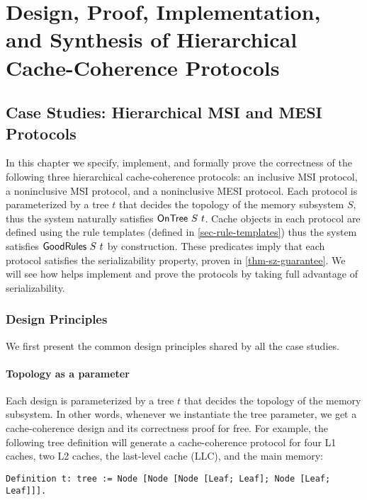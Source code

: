 \part{Design, Proof, Implementation, and Synthesis of Hierarchical Cache-Coherence Protocols}

\chapter{Case Studies: Hierarchical MSI and MESI Protocols}
\label{sec-case-study}

In this chapter we specify, implement, and formally prove the correctness of the following three hierarchical cache-coherence protocols: an inclusive MSI protocol, a noninclusive MSI protocol, and a noninclusive MESI protocol.
Each protocol is parameterized by a tree $t$ that decides the topology of the memory subsystem $S$, thus the system naturally satisfies $\mathsf{OnTree}\ S\ t$.
Cache objects in each protocol are defined using the rule templates (defined in \autoref{sec-rule-templates}) thus the system satisfies $\mathsf{GoodRules}\ S\ t$ by construction.
These predicates imply that each protocol satisfies the serializability property, proven in \autoref{thm-sz-guarantee}.
We will see how \hemiola{} helps implement and prove the protocols by taking full advantage of serializability.

\section{Design Principles}
\label{sec-design-principles}

We first present the common design principles shared by all the case studies.

\subsection{Topology as a parameter}
\label{sec-topo-param}
Each design is parameterized by a tree $t$ that decides the topology of the memory subsystem.
In other words, whenever we instantiate the tree parameter, we get a cache-coherence design and its correctness proof for free.
For example, the following tree definition will generate a cache-coherence protocol for four L1 caches, two L2 caches, the last-level cache (LLC), and the main memory:
\begin{lstlisting}[numbers=none, frame=none]
  Definition t: tree := Node [Node [Node [Leaf; Leaf]; Node [Leaf; Leaf]]].
\end{lstlisting}

